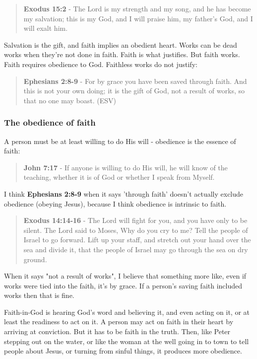 \documentclass[11pt]{article}
\begin{document}
\begin{quote}
\textbf{Exodus 15:2} - The Lord is my strength and my song, and he has become my salvation; this is my God, and I will praise him, my father's God, and I will exalt him.
\end{quote}

Salvation is the gift, and faith implies an obedient heart. Works can be dead works when they're not done in faith. Faith is what justifies. But faith works. Faith requires obedience to God. Faithless works do not justify:

\begin{quote}
\textbf{Ephesians 2:8-9} - For by grace you have been saved through faith. And this is not your own doing; it is the gift of God, not a result of works, so that no one may boast. (ESV)
\end{quote}

\subsubsection{The obedience of faith}
\label{sec:org6ce8976}

A person must be at least willing to do His will - obedience is the essence of faith:

\begin{quote}
\textbf{John 7:17} - If anyone is willing to do His will, he will know of the teaching, whether it is of God or whether I speak from Myself.
\end{quote}

I think \textbf{Ephesians 2:8-9} when it says 'through faith' doesn't actually exclude obedience (obeying Jesus), because I think obedience is intrinsic to faith.

\begin{quote}
\textbf{Exodus 14:14-16} - The Lord will fight for you, and you have only to be silent.  The Lord said to Moses, Why do you cry to me? Tell the people of Israel to go forward.  Lift up your staff, and stretch out your hand over the sea and divide it, that the people of Israel may go through the sea on dry ground.
\end{quote}

When it says "not a result of works", I believe that something more like, even if works were tied into the faith, it's by grace. If a person's saving faith included works then that is fine.

Faith-in-God is hearing God's word and believing it, and even acting on it, or at least the readiness to act on it.
A person may act on faith in their heart by arriving at conviction. But it has to be faith in the truth.
Then, like Peter stepping out on the water, or like the woman at the well going in to town to tell people about Jesus, or turning from sinful things, it produces more obedience.
\end{document}
